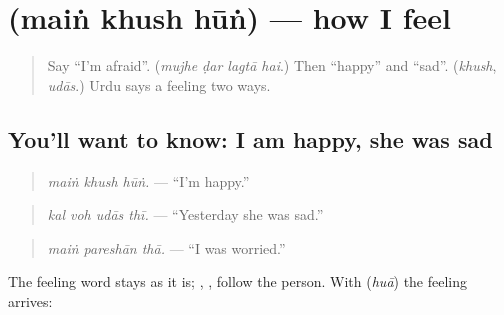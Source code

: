 \section[\texorpdfstring{\ur{میں} \ur{خوش} \ur{ہوں} (maiṅ khush hūṅ)}{میں خوش ہوں (maiṅ khush hūṅ)}]{   (maiṅ khush hūṅ) — how I feel}

\label{lesson:UR-C272-main-khush-hun}



\begin{quote}
Say \textquotedblleft{}I'm afraid\textquotedblright{}. (\emph{mujhe ḍar lagtā hai}.) Then \textquotedblleft{}happy\textquotedblright{} and \textquotedblleft{}sad\textquotedblright{}. (\emph{khush}, \emph{udās}.) Urdu says a feeling two ways.
\end{quote}

\subsection*{You'll want to know: I am happy, she was sad}
\begin{quote}
\textbf{  }
\end{quote}

\begin{quote}
\emph{maiṅ khush hūṅ.} — \textquotedblleft{}I'm happy.\textquotedblright{}
\end{quote}

\begin{quote}
\textbf{   }
\end{quote}

\begin{quote}
\emph{kal voh udās thī.} — \textquotedblleft{}Yesterday she was sad.\textquotedblright{}
\end{quote}

\begin{quote}
\textbf{  }
\end{quote}

\begin{quote}
\emph{maiṅ pareshān thā.} — \textquotedblleft{}I was worried.\textquotedblright{}
\end{quote}

The feeling word stays as it is; \textbf{}, \textbf{}, \textbf{} follow the person. With \textbf{} (\emph{huā}) the feeling arrives:

\begin{quote}
\textbf{     }
\end{quote}

